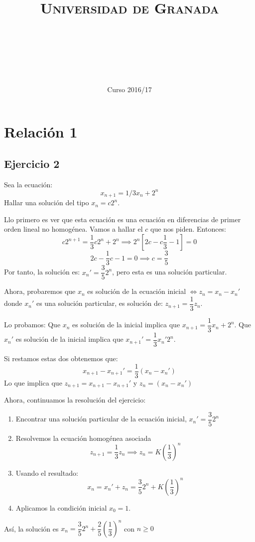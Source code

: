 \documentclass[11pt, a4paper, titlepage]{article}
\title{
  \normalfont \normalsize 
  \textsc{Universidad de Granada} \\ [25pt]    %
  \horrule{0.5pt} \\[0.4cm] %
  \huge \subject\\ %
  \horrule{2pt} \\[0.5cm] %
}
\author{\Large{\docauthor}}
\date{\vspace{-1.5em} \normalsize Curso 2016/17}
\theoremstyle{theorem-style}
\theoremstyle{definition-style}
\theoremstyle{remark-style}
\theoremstyle{example-style}
\begin{document}
\maketitle  %
\begin{center}
\end{center}
\newpage



\section{Relación 1}
\subsection{Ejercicio 2}

Sea la ecuación:
\[
x _{n+1} =  1/3 x_n +2^n
\]
Hallar una solución del tipo $x_n=c2^n$. 

Llo primero es ver que esta ecuación es una ecuación en diferencias de primer orden lineal no homogénea. Vamos a hallar el $c$ que nos piden. Entonces:
\[
c2^{n+1}= \dfrac{1}{3}c2^n+2^n  \implies 2^n[2c-c\dfrac{1}{3}-1] = 0
\]
\[
2c-\dfrac{1}{3}c-1 = 0 \implies c = \dfrac{3}{5}
\]
Por tanto, la solución es: $x_n' =\dfrac{3}{5}2^n $, pero esta es una solución particular.

Ahora, probaremos que $x_n$ es solución de la ecuación inicial $\iff z_n = x_n - x_n'$ donde $x_n'$ es una solución particular, es solución de:
$z _{n+1} = \dfrac{1}{3} z_n$.

Lo probamos:
Que $x_n$ es solución de la inicial implica que $x _{n+1} =  \dfrac{1}{3} x_n +2^n$.
Que $x_n'$ es solución de la inicial implica que $x _{n+1}' = \dfrac{1}{3}x_n' 2^n$.

Si restamos estas dos obtenemos que:
\[
x _{n+1} - x _{n+1}' = \dfrac{1}{3}(x_n- x_n')
\]
Lo que implica que $z _{n+1} = x _{n+1} - x _{n+1}'$ y $z_n =(x_n- x_n') $

Ahora, continuamos la resolución del ejercicio:
\begin{enumerate}
	\item Encontrar una solución particular de la ecuación inicial, $x_n' = \dfrac{3}{5}2^n$
	\item Resolvemos la ecuación homogénea asociada
	\[
	z _{n+1} = \dfrac{1}{3}z_n  \implies z_n = K(\dfrac{1}{3})^n
	\]
	\item Usando el resultado:
	\[
	x_n = x_n' + z_n = \dfrac{3}{5}2^n+K(\dfrac{1}{3})^n
	\]
	\item Aplicamos la condición inicial $x_0 = 1$.
	
	
\end{enumerate}
Así, la solución es $x_n = \dfrac{3}{5}2^n +\dfrac{2}{5}(\dfrac{1}{3})^n$ con $n\geq 0$
\end{document}
